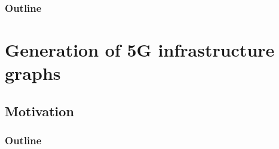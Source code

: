 \documentclass[aspectratio=169]{beamer}
\begin{document}





\begin{frame}
    \frametitle{Outline}
\end{frame}



\section{Generation of 5G infrastructure graphs}
\subsection{Motivation}
\begin{frame}
    \frametitle{Outline}
    \tableofcontents[subsectionstyle=show/shaded/hide,sectionstyle=show/shaded]
\end{frame}


\end{document}
